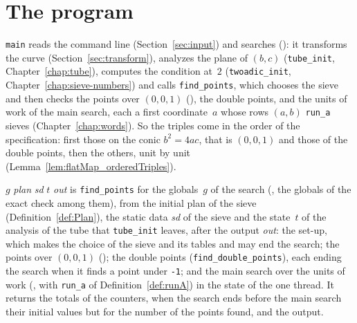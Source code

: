 \section{The program}\label{sec:program}

\texttt{main} reads the command line (Section~\ref{sec:input}) and searches
(): it transforms the curve (Section~\ref{sec:transform}), analyzes
the plane of $(b, c)$ (\texttt{tube\_init}, Chapter~\ref{chap:tube}), computes the condition at~$2$
(\texttt{twoadic\_init}, Chapter~\ref{chap:sieve-numbers}) and calls \texttt{find\_points}, which
chooses the sieve and then checks the points over $(0, 0, 1)$ (),
the double points, and the units of work of the main search, each a first coordinate~$a$ whose rows
$(a, b)$ \texttt{run\_a} sieves (Chapter~\ref{chap:words}). So the triples come in the order of the
specification: first those on the conic $b^2 = 4ac$, that is $(0, 0, 1)$ and those of the double
points, then the others, unit by unit (Lemma~\ref{lem:flatMap_orderedTriples}).

\begin{definition}\label{def:findPoints}
  \leanok
   $g$ \textit{plan} \textit{sd} $t$ \textit{out} is
  \texttt{find\_points} for the globals~$g$ of the search (, the
  globals of the exact check among them), from the initial plan of the sieve
  (Definition~\ref{def:Plan}), the static data \textit{sd} of the sieve and the state~$t$ of the
  analysis of the tube that \texttt{tube\_init} leaves, after the output \textit{out}: the set-up,
  which makes the choice of the sieve and its tables and may end the search; the points over $(0,
  0, 1)$ (); the double points (\texttt{find\_double\_points}),
  each ending the search when it finds a point under \texttt{-1}; and the main search over the
  units of work (, with \texttt{run\_a} of Definition~\ref{def:runA}) in
  the state of the one thread. It returns the totals of the counters, when the search ends before
  the main search their initial values but for the number of the points found, and the output.
\end{definition}

